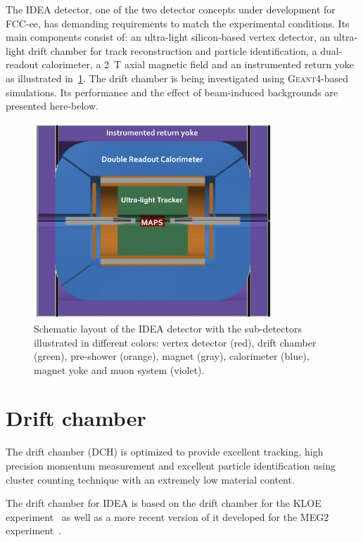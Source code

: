 \documentclass{cernatsnote}
\begin{document}
The IDEA detector, one of the two detector concepts under development for FCC-ee, has demanding requirements to match the experimental conditions. Its main components consist of: an ultra-light silicon-based vertex detector, an ultra-light drift chamber for track reconstruction and particle identification, a dual-readout calorimeter, a 2~T axial magnetic field and an instrumented return yoke as illustrated in~\cref{fig_IDEA}. The drift chamber is being investigated using \textsc{Geant4}-based simulations. Its performance and the effect of beam-induced backgrounds are presented here-below.

\begin{figure}[ht]
	\centering
	\includegraphics[width=0.8\textwidth]{figures/FCCeeIDEAConcept}%
	\caption{Schematic layout of the IDEA detector with the sub-detectors illustrated in different colors: vertex detector (red), drift chamber (green), pre-shower (orange), magnet (gray), calorimeter (blue), magnet yoke and muon system (violet).}
	\label{fig_IDEA}
\end{figure}

\section{Drift chamber}
The drift chamber (DCH) is optimized to provide excellent tracking, high precision momentum measurement and excellent particle identification using cluster counting technique with an extremely low material content.

The drift chamber for IDEA is based on the drift chamber for the KLOE experiment~\cite{DeLucia:2018qoc} as well as a more recent version of it developed for the MEG2 experiment~\cite{Baldini:2018nnn}.
\end{document}
